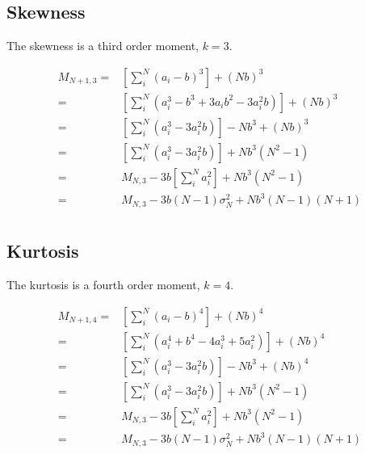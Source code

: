 \documentclass[a4paper]{article}
\begin{document}
\subsection{Skewness}
The skewness is a third order moment, $k=3$. 

\begin{align}
M_{N+1,3} = & \left[\sum_i^N (a_i - b)^3 \right]+ (Nb)^3 \nonumber \\
 = & \left[\sum_i^N (a_i^3 - b^3 +3a_ib^2 - 3a_i^2b) \right]+ (Nb)^3 \nonumber \\
 = & \left[\sum_i^N (a_i^3 - 3a_i^2b) \right] -Nb^3 + (Nb)^3 \nonumber \\
 = & \left[\sum_i^N (a_i^3 - 3a_i^2b) \right]+ Nb^3 (N^2-1)  \nonumber \\
 = & M_{N,3} - 3b \left[\sum_i^N a_i^2 \right]+ Nb^3 (N^2-1)  \nonumber \\
 = & M_{N,3} - 3 b (N-1)\sigma_N^2 + Nb^3 (N-1)(N+1)  \nonumber \\
\end{align}
\subsection{Kurtosis}
The kurtosis is a fourth order moment, $k=4$. 

\begin{align}
M_{N+1,4} = & \left[\sum_i^N (a_i - b)^4 \right]+ (Nb)^4 \nonumber \\
 = & \left[\sum_i^N (a_i^4 +b^4-4a_i^3+5a_i^2) \right]+ (Nb)^4 \nonumber \\
 = & \left[\sum_i^N (a_i^3 - 3a_i^2b) \right] -Nb^3 + (Nb)^4 \nonumber \\
 = & \left[\sum_i^N (a_i^3 - 3a_i^2b) \right]+ Nb^3 (N^2-1)  \nonumber \\
 = & M_{N,3} - 3b \left[\sum_i^N a_i^2 \right]+ Nb^3 (N^2-1)  \nonumber \\
 = & M_{N,3} - 3 b (N-1)\sigma_N^2 + Nb^3 (N-1)(N+1)  \nonumber \\
\end{align}
\end{document}
